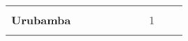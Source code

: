 \begin{tabular}{lccccccccc}
	&\cellcolor[HTML]{FCC46C}					&\cellcolor[HTML]{FCC46C}\\
	\textbf{Urubamba}                                                    
    &\cellcolor[HTML]{FCC46C} 		 			&\cellcolor[HTML]{FCC46C}					&\cellcolor[HTML]{FCC46C}      
	&\cellcolor[HTML]{FCC46C}					&\cellcolor[HTML]{FCC46C}		
	&\cellcolor[HTML]{FCC46C}					&1
	&\cellcolor[HTML]{FCC46C}					&\cellcolor[HTML]{FCC46C}\\
	&\multicolumn{1}{l}{}                       &\multicolumn{1}{l}{}            &\multicolumn{1}{l}{}                         
	&\multicolumn{1}{l}{}                       &\multicolumn{1}{l}{}            &\multicolumn{1}{l}{}                       &\multicolumn{1}{l}{}                       &\multicolumn{1}{l}{}            &\multicolumn{1}{l}{}    
\end{tabular}
